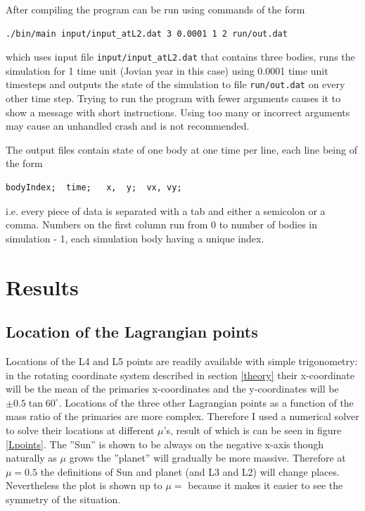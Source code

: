 \documentclass[12pt,a4paper,titlepage]{article}
\begin{document}
After compiling the program can be run using commands of the form
\begin{lstlisting}
./bin/main input/input_atL2.dat 3 0.0001 1 2 run/out.dat
\end{lstlisting}
which uses input file \texttt{input/input\_atL2.dat} that contains three bodies, runs the simulation for 1 time unit (Jovian year in this case) using 0.0001 time unit timesteps and outputs the state of the simulation to file \texttt{run/out.dat} on every other time step. Trying to run the program with fewer arguments causes it to show a message with short instructions. Using too many or incorrect arguments may cause an unhandled crash and is not recommended.

The output files contain state of one body at one time per line, each line being of the form
\begin{lstlisting}
bodyIndex;	time;	x,	y;	vx,	vy;
\end{lstlisting}
i.e. every piece of data is separated with a tab and either a semicolon or a comma. Numbers on the first column run from 0 to number of bodies in simulation - 1, each simulation body having a unique index.

\section{Results}
\subsection{Location of the Lagrangian points}
Locations of the L4 and L5 points are readily available with simple trigonometry: in the rotating coordinate system described in section \ref{theory} their x-coordinate will be the mean of the primaries x-coordinates and the y-coordinates will be $\pm0.5 \tan{60^{\circ}}$. Locations of the three other Lagrangian points as a function of the mass ratio of the primaries are more complex. Therefore I used a numerical solver to solve their locations at different $\mu$'s, result of which is can be seen in figure \ref{Lpoints}. The ''Sun'' is shown to be always on the negative x-axis though naturally as $\mu$ grows the ''planet'' will gradually be more massive. Therefore at $\mu = 0.5$ the definitions of Sun and planet (and L3 and L2) will change places. Nevertheless the plot is shown up to $\mu = $ because it makes it easier to see the symmetry of the situation.
\end{document}
